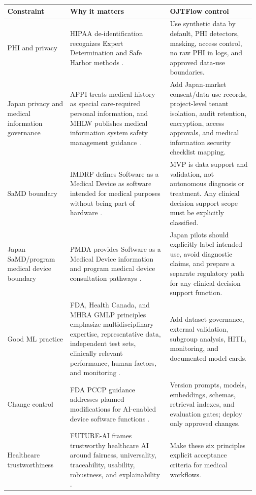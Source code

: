 \begin{longtable}{p{}p{}p{}}
\toprule
\textbf{Constraint} & \textbf{Why it matters} & \textbf{OJTFlow control} \\
\midrule
PHI and privacy & HIPAA de-identification recognizes Expert Determination and Safe Harbor methods \cite{hipaaDeid}. & Use synthetic data by default, PHI detectors, masking, access control, no raw PHI in logs, and approved data-use boundaries. \\
\addlinespace
Japan privacy and medical information governance & APPI treats medical history as special care-required personal information, and MHLW publishes medical information system safety management guidance \cite{japanAPPI,mhlwMedicalInfoSecurity}. & Add Japan-market consent/data-use records, project-level tenant isolation, audit retention, encryption, access approvals, and medical information security checklist mapping. \\
\addlinespace
SaMD boundary & IMDRF defines Software as a Medical Device as software intended for medical purposes without being part of hardware \cite{imdrfSamd}. & MVP is data support and validation, not autonomous diagnosis or treatment. Any clinical decision support scope must be explicitly classified. \\
\addlinespace
Japan SaMD/program medical device boundary & PMDA provides Software as a Medical Device information and program medical device consultation pathways \cite{pmdaSaMD}. & Japan pilots should explicitly label intended use, avoid diagnostic claims, and prepare a separate regulatory path for any clinical decision support function. \\
\addlinespace
Good ML practice & FDA, Health Canada, and MHRA GMLP principles emphasize multidisciplinary expertise, representative data, independent test sets, clinically relevant performance, human factors, and monitoring \cite{fdaGMLP}. & Add dataset governance, external validation, subgroup analysis, HITL, monitoring, and documented model cards. \\
\addlinespace
Change control & FDA PCCP guidance addresses planned modifications for AI-enabled device software functions \cite{fdaPCCP}. & Version prompts, models, embeddings, schemas, retrieval indexes, and evaluation gates; deploy only approved changes. \\
\addlinespace
Healthcare trustworthiness & FUTURE-AI frames trustworthy healthcare AI around fairness, universality, traceability, usability, robustness, and explainability \cite{futureAI}. & Make these six principles explicit acceptance criteria for medical workflows. \\

\end{longtable}
